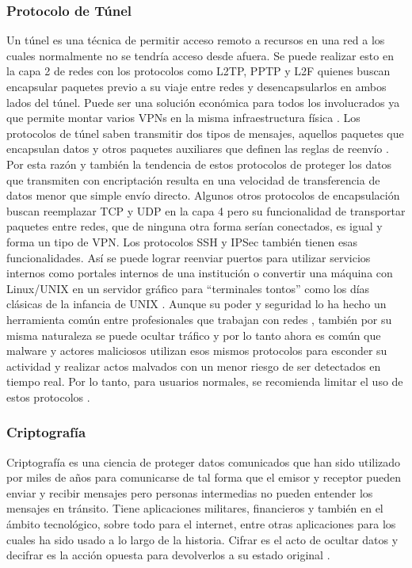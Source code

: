 \subsubsection{Protocolo de Túnel}
Un túnel es una técnica de permitir acceso remoto a recursos en una red a los cuales normalmente no se tendría acceso desde afuera. Se puede realizar esto en la capa 2 de redes con los protocolos como L2TP, PPTP y L2F quienes buscan encapsular paquetes previo a su viaje entre redes y desencapsularlos en ambos lados del túnel. Puede ser una solución económica para todos los involucrados ya que permite montar varios VPNs en la misma infraestructura física \citep{Cisco-Tunneling}. Los protocolos de túnel saben transmitir dos tipos de mensajes, aquellos paquetes que encapsulan datos y otros paquetes auxiliares que definen las reglas de reenvío \citep{Kaspersky-Tunneling}. Por esta razón y también la tendencia de estos protocolos de proteger los datos que transmiten con encriptación resulta en una velocidad de transferencia de datos menor que simple envío directo. Algunos otros protocolos de encapsulación buscan reemplazar TCP y UDP en la capa 4 pero su funcionalidad de transportar paquetes entre redes, que de ninguna otra forma serían conectados, es igual y forma un tipo de VPN. Los protocolos SSH y IPSec también tienen esas funcionalidades. Así se puede lograr reenviar puertos para utilizar servicios internos como portales internos de una institución o convertir una máquina con Linux/UNIX en un servidor gráfico para “terminales tontos” \citep{ENP-Tunneling} como los días clásicas de la infancia de UNIX \citep{GeerlingJeff-History-Remote-Access}. Aunque su poder y seguridad lo ha hecho un herramienta común entre profesionales que trabajan con redes \citep{ENP-Tunneling}, también por su misma naturaleza se puede ocultar tráfico y por lo tanto ahora es común que malware y actores maliciosos utilizan esos mismos protocolos para esconder su actividad y realizar actos malvados con un menor riesgo de ser detectados en tiempo real. Por lo tanto, para usuarios normales, se recomienda limitar el uso de estos protocolos \citep{Kaspersky-Tunneling}.

\subsubsection{Criptografía}
Criptografía es una ciencia de proteger datos comunicados que han sido utilizado por miles de años para comunicarse de tal forma que el emisor y receptor pueden enviar y recibir mensajes pero personas intermedias no pueden entender los mensajes en tránsito. Tiene aplicaciones militares, financieros y también en el ámbito tecnológico, sobre todo para el internet, entre otras aplicaciones para los cuales ha sido usado a lo largo de la historia. Cifrar es el acto de ocultar datos y decifrar es la acción opuesta para devolverlos a su estado original \citep{Khanacademy-What-is-Cryptography}.

